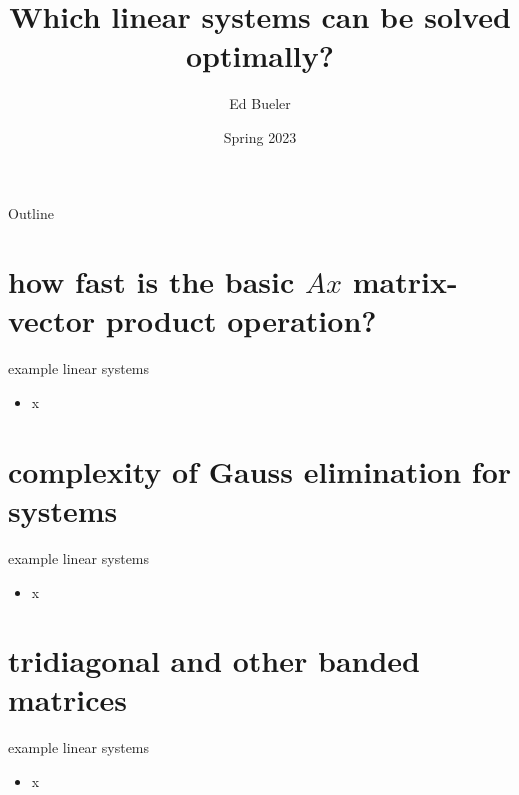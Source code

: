 \documentclass[10pt,hyperref]{beamer}
\title{Which linear systems can be solved optimally?}
\author{Ed Bueler}
\institute[]{UAF Math 692 Scalable Seminar}
\date{Spring 2023}
\begin{document}
\begin{frame}
  \maketitle
\end{frame}

\begin{frame}{Outline}
  \tableofcontents[hideallsubsections]
\end{frame}

\section{how fast is the basic $Ax$ matrix-vector product operation?}

\begin{frame}{example linear systems}

\begin{itemize}
\item x
\end{itemize}
\end{frame}


\section{complexity of Gauss elimination for systems}

\begin{frame}{example linear systems}

\begin{itemize}
\item x
\end{itemize}
\end{frame}

\section{tridiagonal and other banded matrices}

\begin{frame}{example linear systems}

\begin{itemize}
\item x
\end{itemize}
\end{frame}
\end{document}
